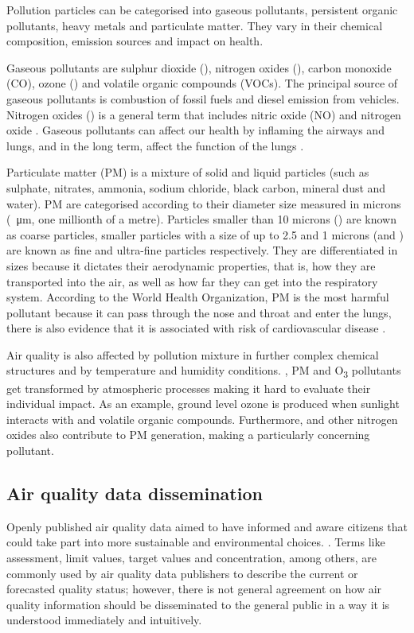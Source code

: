 Pollution particles can be categorised into gaseous pollutants, persistent organic pollutants, heavy metals and particulate matter. They vary in their chemical composition, emission sources and impact on health. 

Gaseous pollutants are sulphur dioxide (\SOTWO), nitrogen oxides (\NOX), carbon monoxide (CO), ozone (\OTHREE) and volatile organic compounds (VOCs). The principal source of gaseous pollutants is combustion of fossil fuels and diesel emission from vehicles. Nitrogen oxides (\NOX) is a general term that includes nitric oxide (NO) and nitrogen oxide \NOTWO. Gaseous pollutants can affect our health by inflaming the airways and lungs, and in the long term, affect the function of the lungs \cite{AirQualityExpertGroup2004} \cite{WHO2003}.

Particulate matter (PM) is a mixture of solid and liquid particles (such as sulphate, nitrates, ammonia, sodium chloride, black carbon, mineral dust and water). PM are categorised according to their diameter size measured in microns (\SI{}{\micro\metre}, one millionth of a metre). Particles smaller than 10 microns (\PMTEN) are known as coarse particles, smaller particles with a size of up to 2.5 and 1 microns (\PMTWO and \PMONE) are known as fine and ultra-fine particles respectively. They are differentiated in sizes because it dictates their aerodynamic properties, that is, how they are transported into the air, as well as how far they can get into the respiratory system. According to the World Health Organization, PM is the most harmful pollutant because it can pass through the nose and throat and enter the lungs, there is also evidence that it is associated with risk of cardiovascular disease \cite{Polichetti2009}. 

Air quality is also affected by pollution mixture in further complex chemical structures and by temperature and humidity conditions. \NOTWO, PM and O\textsubscript{3}  pollutants get transformed by atmospheric processes making it hard to evaluate their individual impact. As an example, ground level ozone is produced when sunlight interacts with \NOTWO and volatile organic compounds. Furthermore, \NOTWO and other nitrogen oxides also contribute to PM generation, making \NOX a particularly concerning pollutant.

\subsection{Air quality data dissemination}
Openly published air quality data aimed to have informed and aware citizens that could take part into more sustainable and environmental choices.  \cite{Thinh2007}. Terms like assessment, limit values, target values and concentration, among others, are commonly used by air quality data publishers to describe the current or forecasted quality status; however, there is not general agreement on how air quality information should be disseminated to the general public in a way it is understood immediately and intuitively. 

